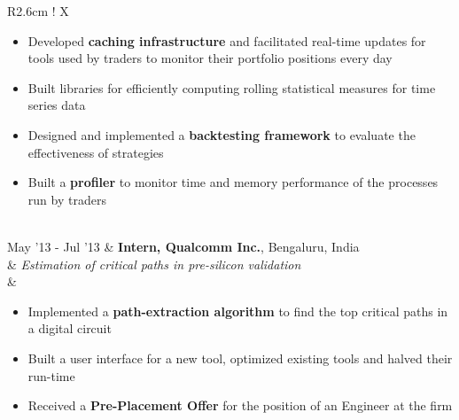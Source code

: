 \documentclass[8pt,a4paper,English]{article}
\newcommand{\lv}{\color{table-border}\vrule}
\begin{document}
\begin{tabularx}{\textwidth}{ R{2.6cm} !{\lv} X }
\begin{minipage}[t]{0.8\textwidth}
\begin{itemize}[label={--},leftmargin=*]
	                    \setlength\itemsep{-10pt}
	                    		\item Developed \textbf{caching infrastructure} and facilitated real-time updates for tools used by traders to monitor their portfolio positions every day\\
	                    		\item Built libraries for efficiently computing rolling statistical measures for time series data \\
	                    		\item Designed and implemented a \textbf{backtesting framework} to evaluate the effectiveness of strategies \\
	                    		\item Built a \textbf{profiler} to monitor time and memory performance of the processes run by traders \\[-4pt]
	                    \end{itemize} 
                      \end{minipage} \\

  May '13 - Jul '13 & \textbf{Intern, Qualcomm Inc.}, Bengaluru, India \\
  					& \emph{Estimation of critical paths in pre-silicon validation} \\
  					& \begin{minipage}[t]{0.8\textwidth}
	                  \begin{itemize}[label={--},leftmargin=*]
	                    \setlength\itemsep{-10pt}
		                    \item Implemented a \textbf{path-extraction algorithm} to find the top critical paths in a digital circuit \\
		                    \item Built a user interface for a new tool, optimized existing tools and halved their run-time \\
		                    \item Received a \textbf{Pre-Placement Offer} for the position of an Engineer at the firm \\[-4pt] 	                    
	                    \end{itemize} 
                      \end{minipage} \\


\end{tabularx}
\end{document}
